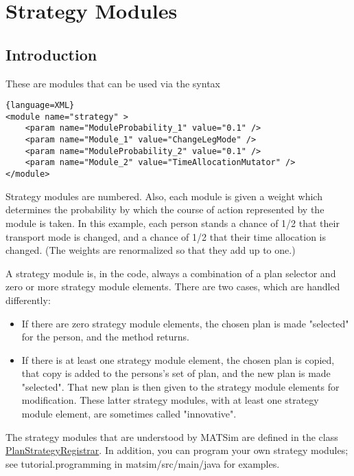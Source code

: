 \chapter{Strategy Modules}

\section{Introduction}
\label{sec:introduction}


These are modules that can be used via the syntax
\begin{lstlisting}{language=XML}
<module name="strategy" >
    <param name="ModuleProbability_1" value="0.1" />
    <param name="Module_1" value="ChangeLegMode" />
    <param name="ModuleProbability_2" value="0.1" />
    <param name="Module_2" value="TimeAllocationMutator" />
</module>
\end{lstlisting}


Strategy modules are numbered. Also, each  module is given a weight which determines the probability by which the  course of action represented by the module is taken. In this example,  each person stands a chance of 1/2 that their transport mode is changed,  and a chance of 1/2 that their time allocation is changed. (The  weights are renormalized so that they add up to one.)

A strategy module is, in the code, always a combination of a plan  selector and zero or more strategy module elements. There are two cases,  which are handled differently:
\begin{itemize}
	\item If there are zero strategy module elements, the chosen plan is made "selected" for the person, and the method returns.
	\item If there is at least one strategy module element, the chosen plan is  copied, that copy is added to the persons's set of plan, and the new  plan is made "selected". That new plan is then given to the  strategy module elements for modification. These latter strategy  modules, with at least one strategy module element, are sometimes called  "innovative".
\end{itemize}

The strategy modules that are understood by MATSim are defined in the class \href{http://www.matsim.org/xref/org/matsim/core/controler/PlanStrategyRegistrar.html}{PlanStrategyRegistrar}. In addition, you can program your own strategy modules; see tutorial.programming in matsim/src/main/java for examples.

